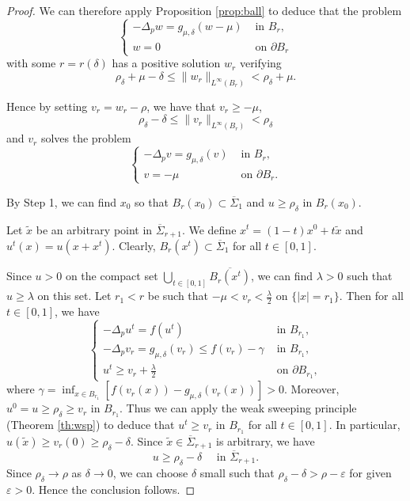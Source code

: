 \documentclass[10pt,a4paper]{amsart}
\begin{document}
\begin{proof}
		We can therefore apply Proposition \ref{prop:ball} to deduce that the problem
		\[
		\begin{cases}
			-\Delta_p w = g_{\mu,\delta}(w-\mu) &\text{ in } B_r,\\
			w = 0 &\text{ on } \partial B_r
		\end{cases}
		\]
		with some $r=r(\delta)$ has a positive solution $w_r$ verifying
		\[
		\rho_\delta + \mu - \delta \le \|w_r\|_{L^\infty(B_r)} < \rho_\delta + \mu.
		\]
		
		Hence by setting $v_r=w_r-\rho$, we have that $v_r\ge-\mu$,
		\[
		\rho_\delta - \delta \le \|v_r\|_{L^\infty(B_r)} < \rho_\delta
		\]
		and $v_r$ solves the problem
		\[
		\begin{cases}
			-\Delta_p v = g_{\mu,\delta}(v) &\text{ in } B_r,\\
			v = -\mu &\text{ on } \partial B_r.
		\end{cases}
		\]
		
		By Step 1, we can find $x_0$ so that
		$B_r(x_0) \subset \overline\Sigma_1$ and $u \ge \rho_\delta$ in $B_r(x_0)$.
		
		Let $\tilde{x}$ be an arbitrary point in $\overline\Sigma_{r+1}$. We define $x^t = (1-t)x^0 + t\tilde{x}$ and $u^t(x)=u(x+x^t)$.
		Clearly, $B_r(x^t) \subset \overline\Sigma_1$ for all $t \in [0, 1]$.
		
		Since $u > 0$ on the compact set $\bigcup_{t\in[0,1]} \overline{B_r(x^t)}$, we can find $\lambda > 0$ such that $u \ge \lambda$ on this set. Let $r_1 < r$ be such that $-\mu < v_r < \frac{\lambda}{2}$ on $\{|x| = r_1\}$. Then for all $t \in [0, 1]$, we have
		\[
		\begin{cases}
			-\Delta_p u^t = f(u^t) & \text{ in } B_{r_1},\\
			-\Delta_p v_r = g_{\mu,\delta}(v_r) \le f(v_r) - \gamma & \text{ in } B_{r_1},\\
			u^t \ge v_r + \frac{\lambda}{2} & \text{ on } \partial B_{r_1},
		\end{cases}
		\]
		where $\gamma=\inf_{x\in B_{r_1}} [f (v_r(x)) - g_{\mu,\delta}(v_r(x))] > 0$. Moreover, $u^0 = u \ge \rho_\delta \ge v_r$ in $B_{r_1}$. Thus we can apply the weak sweeping principle (Theorem \ref{th:wsp}) to deduce that $u^t \ge v_r$ in $B_{r_1}$ for all $t \in [0, 1]$. In particular, $u(\tilde{x}) \ge v_r(0) \ge \rho_\delta - \delta$. Since $\tilde{x} \in \overline\Sigma_{r+1}$ is arbitrary, we have
		\[
		u \ge \rho_\delta - \delta \quad \text{ in } \overline\Sigma_{r+1}.
		\]
		Since $\rho_\delta\to\rho$ as $\delta\to0$, we can choose $\delta$ small such that $\rho_\delta - \delta > \rho - \varepsilon$ for given $\varepsilon>0$. Hence the conclusion follows.
		

\end{proof}
\end{document}
